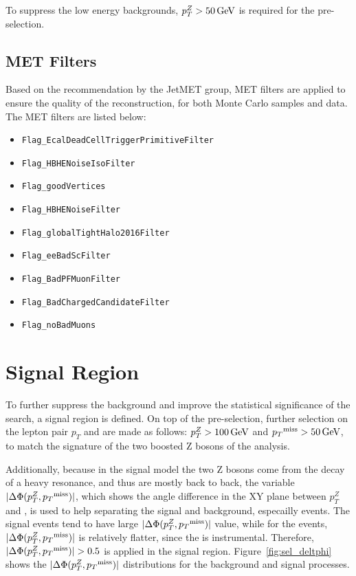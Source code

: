\vspace{0.3cm}
To suppress the low energy backgrounds, $p_T ^Z > 50\,\text{Ge\hspace{-.08em}V}$ is required for the pre-selection.


\subsection{MET Filters}\label{sec:metfilter}
Based on the recommendation by the JetMET group, MET filters are applied to ensure the quality of the \ptmiss reconstruction, for both Monte Carlo samples and data. The MET filters are listed below:
\begin{itemize}
\item \texttt{Flag\_EcalDeadCellTriggerPrimitiveFilter}
\item \texttt{Flag\_HBHENoiseIsoFilter}
\item \texttt{Flag\_goodVertices}
\item \texttt{Flag\_HBHENoiseFilter}
\item \texttt{Flag\_globalTightHalo2016Filter}
\item \texttt{Flag\_eeBadScFilter}
\item \texttt{Flag\_BadPFMuonFilter}
\item \texttt{Flag\_BadChargedCandidateFilter}
\item \texttt{Flag\_noBadMuons}
\end{itemize} 


\section{Signal Region}\label{sec:selection_sr}
To further suppress the background and improve the statistical significance of the search, a signal region is defined. On top of the pre-selection, further selection on the lepton pair $p_T$ and \ptmiss are made as follows: $p_T ^Z > 100\,\text{Ge\hspace{-.08em}V}$ and ${p_T}^\text{miss} > 50\,\text{Ge\hspace{-.08em}V}$, to match the signature of the two boosted Z bosons of the analysis. 

\vspace{0.3cm}
Additionally, because in the signal model the two Z bosons come from the decay of a heavy resonance, and thus are mostly back to back, the variable $|\Delta \Phi (p_T ^Z ,{p_T}^\text{miss})|$, which shows the angle difference in the XY plane between $p_T ^Z$ and \ptmiss, is used to help separating the signal and background, especailly \Zjets events. The signal events tend to have large $|\Delta \Phi (p_T ^Z ,{p_T}^\text{miss})|$ value, while for the \Zjets events, $|\Delta \Phi (p_T ^Z ,{p_T}^\text{miss})|$ is relatively flatter, since the \ptmiss is instrumental. Therefore, $|\Delta \Phi (p_T ^Z ,\ptmiss)|>0.5$ is applied in the signal region. Figure~\ref{fig:sel_deltphi} shows the $|\Delta \Phi (p_T ^Z ,{p_T}^\text{miss})|$ distributions for the background and signal processes.

